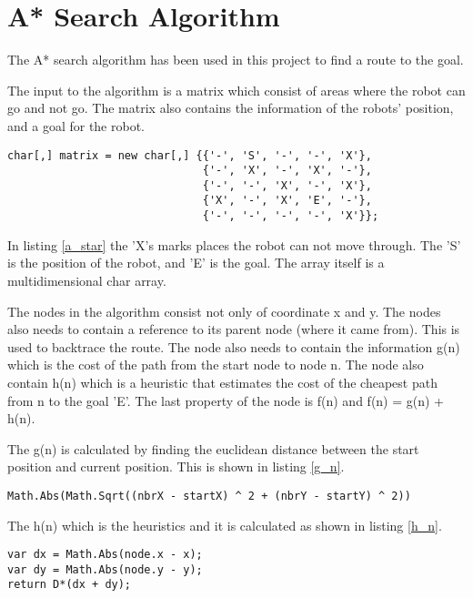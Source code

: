 
\section{A* Search Algorithm}
\label{sec:aStar}

The A* search algorithm has been used in this project to find a route to the goal. 

The input to the algorithm is a matrix which consist of areas where the robot  can go and not go. The matrix also contains the information of the robots' position, and a goal for the robot.

\begin{lstlisting}[caption={An example of the matrix which the A* uses as input.}, label=a_star]
char[,] matrix = new char[,] {{'-', 'S', '-', '-', 'X'},
							  {'-', 'X', '-', 'X', '-'},
							  {'-', '-', 'X', '-', 'X'},
							  {'X', '-', 'X', 'E', '-'},
							  {'-', '-', '-', '-', 'X'}};
\end{lstlisting}

In listing \ref{a_star} the 'X's marks places the robot can not move through. The 'S' is the position of the robot, and 'E' is the goal. The array itself is a multidimensional char array.

The nodes in the algorithm consist not only of coordinate x and y. The nodes also needs to contain a reference to its parent node (where it came from). This is used to backtrace the route. The node also needs to contain the information g(n) which is the cost of the path from the start node to node n. The node also contain h(n) which is a heuristic that estimates the cost of the cheapest path from n to the goal 'E'. The last property of the node is f(n) and f(n) = g(n) + h(n).

The g(n) is calculated by finding the euclidean distance between the start position and current position. This is shown in listing \ref{g_n}.

\begin{lstlisting}[caption={Calculation of g(n).}, label=g_n]
Math.Abs(Math.Sqrt((nbrX - startX) ^ 2 + (nbrY - startY) ^ 2))
\end{lstlisting}

The h(n) which is the heuristics and it is calculated as shown in listing \ref{h_n}. 

\begin{lstlisting}[caption={Calculation of h(n).}, label=h_n]
var dx = Math.Abs(node.x - x);
var dy = Math.Abs(node.y - y);
return D*(dx + dy);
\end{lstlisting}

